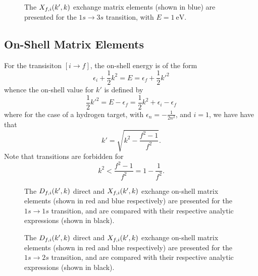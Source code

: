 \documentclass{article}
\begin{document}
\begin{figure}[h]
  \begin{center}
    
  \end{center}
  \caption[Exchange Matrix Elements 1s-3s]{
    The $X_{f, i}(k', k)$ exchange matrix elements (shown in blue) are
    presented for the $1s \to 3s$ transition, with $E = \SI{1}{\eV}$.
  }
  \label{fig:exc-me-1s-3s}
\end{figure}

\clearpage

\subsection{On-Shell Matrix Elements}
\label{sec:on-me}

For the transisiton $[i \to f]$, the on-shell energy is of the form
\begin{equation*}
  \epsilon_{i}
  +
  \dfrac{1}{2}
  k^{2}
  =
  E
  =
  \epsilon_{f}
  +
  \dfrac{1}{2}
  k'^{2}
\end{equation*}
whence the on-shell value for $k'$ is defined by
\begin{equation*}
  \dfrac{1}{2}
  k'^{2}
  =
  E
  -
  \epsilon_{f}
  =
  \dfrac{1}{2}
  k^{2}
  +
  \epsilon_{i}
  -
  \epsilon_{f}
\end{equation*}
where for the case of a hydrogen target, with
$\epsilon_{n} = -\tfrac{1}{2n^{2}}$, and $i = 1$, we have have that
\begin{equation*}
  k'
  =
  \sqrt
  {
    k^{2}
    -
    \dfrac{f^{2} - 1}{f^{2}}
  }
  .
\end{equation*}
Note that transitions are forbidden for
\begin{equation*}
  k^{2}
  <
  \dfrac{f^{2} - 1}{f^{2}}
  =
  1
  -
  \dfrac{1}{f^{2}}
  .
\end{equation*}

\begin{figure}[h]
  \begin{center}
    
  \end{center}
  \caption[On-Shell Matrix Elements 1s-1s]{
    The $D_{f, i}(k', k)$ direct and $X_{f, i}(k', k)$ exchange on-shell
    matrix elements (shown in red and blue respectively) are presented for the
    $1s \to 1s$ transition, and are compared with their respective analytic
    expressions (shown in black).
  }
  \label{fig:on-me-1s-1s}
\end{figure}

\begin{figure}[h]
  \begin{center}
    
  \end{center}
  \caption[On-Shell Matrix Elements 1s-2s]{
    The $D_{f, i}(k', k)$ direct and $X_{f, i}(k', k)$ exchange on-shell
    matrix elements (shown in red and blue respectively) are presented for the
    $1s \to 2s$ transition, and are compared with their respective analytic
    expressions (shown in black).
  }
  \label{fig:on-me-1s-2s}
\end{figure}
\end{document}
